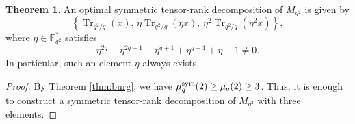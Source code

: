 \documentclass[11pt,a4paper,reqno]{article}
\numberwithin{equation}{section}
\theoremstyle{definition}
\newtheorem{theorem}{Theorem}[section]
\def\sym{\textup{sym}}
\begin{document}
\begin{theorem}\label{thm:m=2}
An optimal symmetric tensor-rank decomposition of \(M_{q^2}\) is given by
\begin{equation}\label{eq:3traces1,eta,eta2}
\left\{
\operatorname{Tr}_{q^2/q}(x),\,
\eta\operatorname{Tr}_{q^2/q}(\eta x),\,
\eta^2\operatorname{Tr}_{q^2/q}(\eta^2x)
\right\},
\end{equation}
where \(\eta\in\mathbb F_{q^2}^{*}\) satisfies
\[
\eta^{2q}-\eta^{2q-1}-\eta^{q+1}+\eta^{q-1}+\eta-1\neq 0.
\]
In particular, such an element \(\eta\) always exists.
\end{theorem}
\begin{proof}
By Theorem \ref{thm:burg}, we have $ \mu_q^\sym(2) \geq  \mu_q(2)\geq 3$.
Thus, it is enough to construct a symmetric tensor-rank decomposition of
\(M_{q^2}\) with three elements.


\end{proof}
\end{document}
